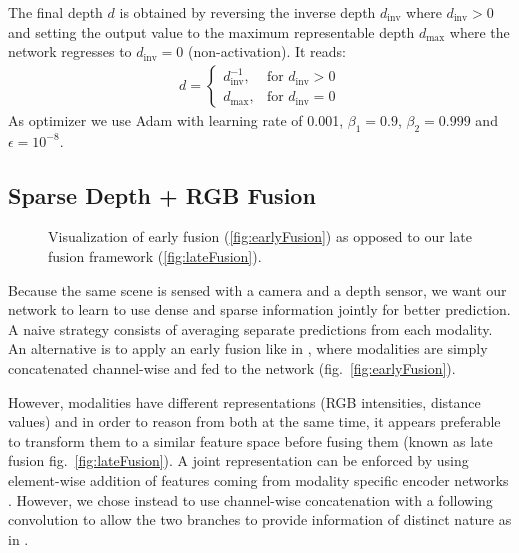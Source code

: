 \documentclass[10pt,twocolumn,letterpaper]{article}
\begin{document}
The final depth $d$ is obtained by reversing the inverse depth $d_{\text{inv}}$ where $d_{\text{inv}} > 0$ and setting the output value to the maximum representable depth $d_{\text{max}}$ 
where the network regresses to $d_{\text{inv}} = 0$ (non-activation). It reads:
\begin{align}\label{eq:depthOutput}
d =
\begin{cases}
	d^{-1}_{\text{inv}}, & \text{for } d_{\text{inv}} > 0\\
	d_{\text{max}}, & \text{for } d_{\text{inv}} = 0
\end{cases}
\end{align}
As optimizer we use Adam with learning rate of 0.001, $\beta_1=0.9$, $\beta_2=0.999$ and $\epsilon=10^{-8}$.

\subsection{Sparse Depth + RGB Fusion}
\label{sec:fusion}
\begin{figure}
	\centering
	\caption{Visualization of early fusion (\ref{fig:earlyFusion}) as opposed to our late fusion framework (\ref{fig:lateFusion}).}
\end{figure}

Because the same scene is sensed with a camera and a depth sensor, we want our network to learn to use dense and sparse information jointly for better prediction. A naive strategy consists of averaging separate predictions from each modality. An alternative is to apply an early fusion like in \cite{ma2018sparse}, where modalities are simply concatenated channel-wise and fed to the network (fig.~\ref{fig:earlyFusion}).

However, modalities have different representations (RGB intensities, distance values) and in order to reason from both at the same time, it appears preferable to transform them to a similar feature space before fusing them (known as late fusion fig.~\ref{fig:lateFusion}). A joint representation can be enforced by using element-wise addition of features coming from modality specific encoder networks \cite{chen2017multi}. However, we chose instead to use channel-wise concatenation with a following convolution to allow the two branches to provide information of distinct nature as in \cite{valada2017adapnet}.
\end{document}
